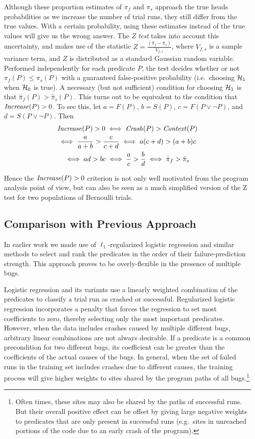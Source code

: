 Although these proportion estimates of $\pi_f$ and $\pi_s$ approach the
true heads probabilities as we increase the number of trial runs, they
still differ from the true values.  With a certain probability, using these
estimates instead of the true values will give us the wrong
answer.  The \textit{Z test} takes into account this uncertainty, and
makes use of the statistic $ Z = \frac{(\hat \pi_f - \hat
  \pi_s)}{V_{f,s}}$, where $V_{f,s}$ is a sample variance term, and $Z$
is distributed as a standard Gaussian random
variable.  Performed independently for each predicate $P$, the test
decides whether or not $\pi_f(P) \leq \pi_s(P)$ with a guaranteed
false-positive probability (i.e.\ choosing ${\mathcal{H}}_1$ when ${\mathcal{H}}_0$ is true).
A necessary (but not sufficient) condition for choosing ${\mathcal{H}}_1$ is that
$\hat \pi_f(P) > \hat \pi_s(P)$.  This turns out to be
equivalent to the condition that $\mbox{\textit{Increase}}(P) > 0$.  To see this,
let $a = F(P)$, $b = S(P)$, $c = F(P\lor\lnot P)$, and $d = S(P\lor\lnot P)$.
Then
\begin{gather*}
  \mbox{\textit{Increase}}(P) > 0 \iff \mbox{\textit{Crash}}(P) > \mbox{\textit{Context}}(P) \\
  \iff \frac{a}{a+b} > \frac{c}{c+d}
  \iff a (c+d) > (a+b) c \\
  \iff ad > bc \iff \frac{a}{c} > \frac{b}{d}
  \iff \hat \pi_f > \hat \pi_s
\end{gather*}

Hence the $\mbox{\textit{Increase}}(P) > 0$ criterion is not only well motivated
from the program analysis point of view, but can also be seen as a much
simplified version of the Z test for two populations of
Bernoulli trials.

\subsection{Comparison with Previous Approach}
In earlier work \cite{PLDI`03*141,Zheng:2003:SDSP}
we made use of $\ell_1$-regularized logistic regression and similar
methods to select and rank the predicates in the order of their
failure-prediction strength.  This approach proves to be
overly-flexible in the presence of multiple bugs.

Logistic regression and its variants use a linearly weighted
combination of the predicates to classify a trial run as crashed or
successful.  Regularized logistic regression incorporates a penalty
that forces the regression to set most coefficients to zero, thereby
selecting only the most important predicates.  However, when the data
includes crashes caused by multiple different bugs, arbitrary linear
combinations are not always desirable.  If a predicate is a
common precondition for two different bugs, its coefficient
can be greater than the coefficients of the actual causes of the bugs.
In general, when the set of failed runs in
the training set includes crashes due to different causes, the
training process will give higher weights to sites shared by the
program paths of all bugs.\footnote{Often times, these sites may also be
shared by the paths of successful runs.  But their overall positive
effect can be offset by giving large negative weights to predicates
that are only present in successful runs (e.g.\ sites in unreached
portions of the code due to an early crash of the program).}

